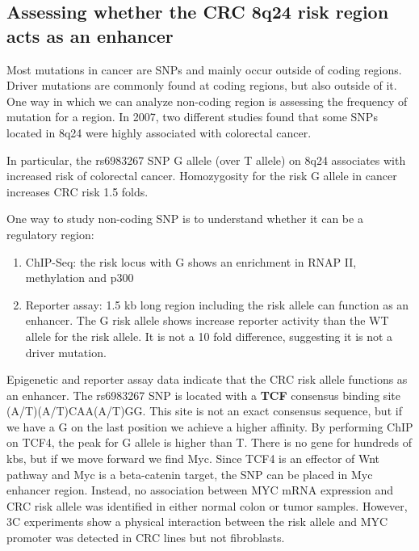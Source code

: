 \hypertarget{assessing-whether-the-crc-8q24-risk-region-acts-as-an-enhancer}{%
\subsection{Assessing whether the CRC 8q24 risk region acts as an enhancer}\label{assessing-whether-the-crc-8q24-risk-region-acts-as-an-enhancer}}

Most mutations in cancer are SNPs and mainly occur outside of coding regions. Driver mutations are commonly found at coding regions, but also outside of it. One way in which we can analyze non-coding region is assessing the frequency of mutation for a region. In 2007, two different studies found that some SNPs located in 8q24 were highly associated with colorectal cancer.

In particular, the rs6983267 SNP G allele (over T allele) on 8q24 associates with increased risk of colorectal cancer. Homozygosity for the risk G allele in cancer increases CRC risk 1.5 folds.

One way to study non-coding SNP is to understand whether it can be a regulatory region:

\begin{enumerate}
\def\labelenumi{\arabic{enumi}.}
\tightlist
\item
  ChIP-Seq: the risk locus with G shows an enrichment in RNAP II, methylation and p300
\item
  Reporter assay: 1.5 kb long region including the risk allele can function as an enhancer. The G risk allele shows increase reporter activity than the WT allele for the risk allele. It is not a 10 fold difference, suggesting it is not a driver mutation.
\end{enumerate}

Epigenetic and reporter assay data indicate that the CRC risk allele functions as an enhancer.
The rs6983267 SNP is located with a \textbf{TCF} consensus binding site (A/T)(A/T)CAA(A/T)GG. This site is not an exact consensus sequence, but if we have a G on the last position we achieve a higher affinity. By performing ChIP on TCF4, the peak for G allele is higher than T. There is no gene for hundreds of kbs, but if we move forward we find Myc. Since TCF4 is an effector of Wnt pathway and Myc is a beta-catenin target, the SNP can be placed in Myc enhancer region. Instead, no association between MYC mRNA expression and CRC risk allele was identified in either normal colon or tumor samples. However, 3C experiments show a physical interaction between the risk allele and MYC promoter was detected in CRC lines but not fibroblasts.

